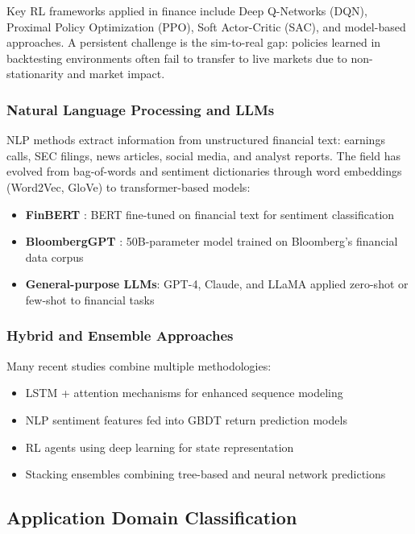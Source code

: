 Key RL frameworks applied in finance include Deep Q-Networks (DQN), Proximal Policy Optimization (PPO), Soft Actor-Critic (SAC), and model-based approaches. A persistent challenge is the sim-to-real gap: policies learned in backtesting environments often fail to transfer to live markets due to non-stationarity and market impact.

\subsubsection{Natural Language Processing and LLMs}

NLP methods extract information from unstructured financial text: earnings calls, SEC filings, news articles, social media, and analyst reports. The field has evolved from bag-of-words and sentiment dictionaries \citep{Loughran2011} through word embeddings (Word2Vec, GloVe) to transformer-based models:

\begin{itemize}[leftmargin=*]
    \item \textbf{FinBERT} \citep{Araci2019}: BERT fine-tuned on financial text for sentiment classification
    \item \textbf{BloombergGPT} \citep{Wu2023}: 50B-parameter model trained on Bloomberg's financial data corpus
    \item \textbf{General-purpose LLMs}: GPT-4, Claude, and LLaMA applied zero-shot or few-shot to financial tasks
\end{itemize}

\subsubsection{Hybrid and Ensemble Approaches}

Many recent studies combine multiple methodologies:
\begin{itemize}[leftmargin=*]
    \item LSTM + attention mechanisms for enhanced sequence modeling
    \item NLP sentiment features fed into GBDT return prediction models
    \item RL agents using deep learning for state representation
    \item Stacking ensembles combining tree-based and neural network predictions
\end{itemize}

\subsection{Application Domain Classification}

